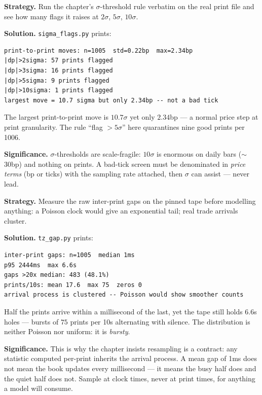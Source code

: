\begin{example}\label{ex:sigmaflag}
\textbf{Strategy.} Run the chapter's $\sigma$-threshold rule
verbatim on the real print file and see how many flags it raises
at $2\sigma$, $5\sigma$, $10\sigma$.

\textbf{Solution.} \texttt{sigma\_flags.py} prints:
\begin{verbatim}
print-to-print moves: n=1005  std=0.22bp  max=2.34bp
|dp|>2sigma: 57 prints flagged
|dp|>3sigma: 16 prints flagged
|dp|>5sigma: 9 prints flagged
|dp|>10sigma: 1 prints flagged
largest move = 10.7 sigma but only 2.34bp -- not a bad tick
\end{verbatim}
The largest print-to-print move is $10.7\sigma$ yet only
$2.34$bp --- a normal price step at print granularity. The rule
``flag $>5\sigma$'' here quarantines nine good prints per 1006.

\textbf{Significance.} $\sigma$-thresholds are scale-fragile:
$10\sigma$ is enormous on daily bars ($\sim$30bp) and nothing on
prints. A bad-tick screen must be denominated in \emph{price
terms} (bp or ticks) with the sampling rate attached, then
$\sigma$ can assist --- never lead.
\end{example}

\begin{example}\label{ex:cluster}
\textbf{Strategy.} Measure the raw inter-print gaps on the pinned
tape before modelling anything: a Poisson clock would give an
exponential tail; real trade arrivals cluster.

\textbf{Solution.} \texttt{tz\_gap.py} prints:
\begin{verbatim}
inter-print gaps: n=1005  median 1ms
p95 2444ms  max 6.6s
gaps >20x median: 483 (48.1%)
prints/10s: mean 17.6  max 75  zeros 0
arrival process is clustered -- Poisson would show smoother counts
\end{verbatim}
Half the prints arrive within a millisecond of the last, yet the
tape still holds $6.6$s holes --- bursts of $75$ prints per 10s
alternating with silence. The distribution is neither Poisson nor
uniform: it is \emph{bursty}.

\textbf{Significance.} This is why the chapter insists resampling
is a contract: any statistic computed per-print inherits the
arrival process. A mean gap of 1ms does not mean the book updates
every millisecond --- it means the busy half does and the quiet
half does not. Sample at clock times, never at print times, for
anything a model will consume.
\end{example}

